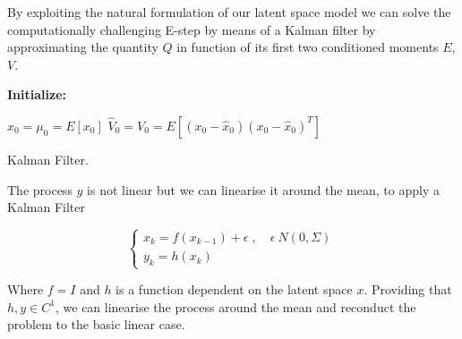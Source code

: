 \documentclass[
	11pt, %
]{beamer}
\begin{document}
\begin{frame}
 By exploiting the natural formulation of our latent space model we can solve the computationally challenging E-step by means of a Kalman filter by approximating the quantity $Q$ in function of its first two conditioned moments $E$, $V$. 
\end{frame}

%
%
%
%


\begin{frame}

\begin{algorithm}[H]

\textbf{Initialize: }
\begin{substeps}
$\hat{x}_0 = \mu_0 = E[x_0]$ \;
$\hat{V}_0 = V_0 = E[(x_0-\hat{x}_0)(x_0-\hat{x}_0)^T]$  \;
\end{substeps}
\caption{Kalman Filter.}
\label{algo:rem_latent}
\end{algorithm}

\end{frame}


\begin{frame}
The process $y$ is not linear but we can linearise it around the mean, to apply a Kalman Filter

\begin{equation}
    \begin{cases}
      x_k = f(x_{k-1}) + \epsilon \; , \quad \epsilon ~ N(0, \Sigma) \\
      y_k = h(x_k) 
    \end{cases}\,
\end{equation}

Where $f = I$ and $h$ is a function dependent on the latent space $x$. Providing that $h, y \in C^1$, we can linearise the process around the mean and reconduct the problem to the basic linear case.
\end{frame}
\end{document}
